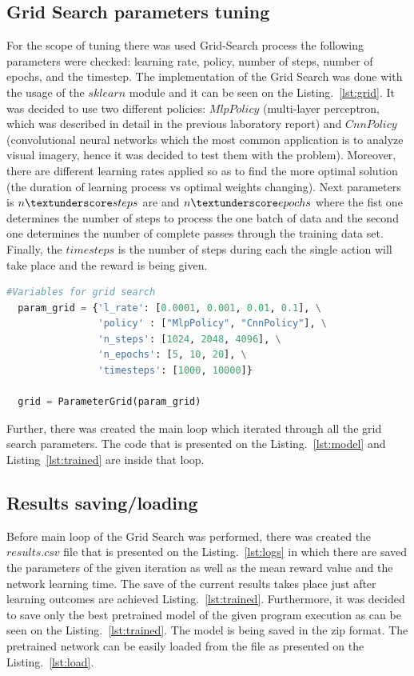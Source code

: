 \documentclass[runningheads]{llncs}
\begin{document}
\subsection{Grid Search parameters tuning}
For the scope of tuning there was used Grid-Search process the following parameters were checked:
learning rate, policy, number of steps, number of epochs, and the timestep.
The implementation of the Grid Search was done with the usage of the $sklearn$ module and it can be seen on the Listing.~\ref{lst:grid}. It was decided to use two different policies: $MlpPolicy$ (multi-layer perceptron, which was described in detail in the previous laboratory report) and $CnnPolicy$ (convolutional neural networks which the most common application is to analyze visual imagery, hence it was decided to test them with the problem). Moreover, there are different learning rates applied so as to find the more optimal solution (the duration of learning process vs optimal weights changing). Next parameters is $n\textunderscore steps$ are and $n\textunderscore epochs$ where the fist one determines the number of steps to process the one batch of data and the second one determines the number of complete passes through the training data set. Finally, the $timesteps$ is the number of steps during each the single action will take place and the reward is being given.
\begin{lstlisting}[caption={Grid Seach parameters}, language=Python, label={lst:grid}]
  #Variables for grid search
  param_grid = {'l_rate': [0.0001, 0.001, 0.01, 0.1], \
                'policy' : ["MlpPolicy", "CnnPolicy"], \
                'n_steps': [1024, 2048, 4096], \
                'n_epochs': [5, 10, 20], \
                'timesteps': [1000, 10000]}

  grid = ParameterGrid(param_grid)  
\end{lstlisting}


Further, there was created the main loop which iterated through all the grid search parameters. The code that is presented on the Listing.~\ref{lst:model} and Listing~\ref{lst:trained} are inside that loop.

\subsection{Results saving/loading}
Before main loop of the Grid Search was performed, there was created the $results.csv$ file that is presented on the Listing.~\ref{lst:logs} in which there are saved the parameters of the given iteration as well as the mean reward value and the network learning time. The save of the current results takes place just after learning outcomes are achieved Listing.~\ref{lst:trained}. Furthermore, it was decided to save only the best pretrained model of the given program execution as can be seen on the Listing.~\ref{lst:trained}. The model is being saved in the zip format. The pretrained network can be easily loaded from the file as presented on the Listing.~\ref{lst:load}.
\end{document}
